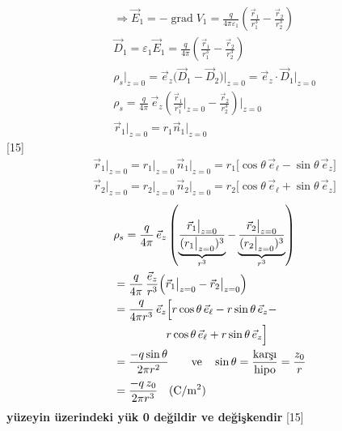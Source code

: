 \documentclass[11pt,a4paper]{article}
\begin{document}
\begin{align*}
&\Rightarrow\vec E_1=-\operatorname{grad}V_1=\frac{q}{4\pi\varepsilon_1}\left(\frac{\vec r_1}{r_1^3}-\frac{\vec r_2}{r_2^3}\right)\\
&\vec D_1=\varepsilon_1\vec E_1=\frac{q}{4\pi}\left(\frac{\vec r_1}{r_1^3}-\frac{\vec r_2}{r_2^3}\right)\\
&\rho_s\Big|_{z=0}=\vec e_z\bigl(\vec D_1-\vec D_2\bigr)\Big|_{z=0}=\vec e_z\cdot\vec D_1\Big|_{z=0}\\
&\rho_s=\frac{q}{4\pi}\,\vec e_z\left(\frac{\vec r_1}{r_1^3}\Big|_{z=0}-\frac{\vec r_2}{r_2^3}\right)\Big|_{z=0}\\
&\vec r_1\Big|_{z=0}=r_1\vec n_1\Big|_{z=0}
\end{align*}
[15]
\begin{align*}
&\vec r_1\Big|_{z=0}=r_1\Big|_{z=0}\,\vec n_1\Big|_{z=0}=r_1\bigl[\cos\theta\,\vec e_\ell-\sin\theta\,\vec e_z\bigr]\\
&\vec r_2\Big|_{z=0}=r_2\Big|_{z=0}\,\vec n_2\Big|_{z=0}=r_2\bigl[\cos\theta\,\vec e_\ell+\sin\theta\,\vec e_z\bigr]
\end{align*}
\begin{align*}
&\rho_s=\frac{q}{4\pi}\,\vec e_z\left(\underbrace{\frac{\vec r_1\big|_{z=0}}{(r_1\big|_{z=0})^3}}_{r^3}-\underbrace{\frac{\vec r_2\big|_{z=0}}{(r_2\big|_{z=0})^3}}_{r^3}\right)\\
&=\frac{q}{4\pi}\,\frac{\vec e_z}{r^3}\Bigl(\vec r_1\big|_{z=0}-\vec r_2\big|_{z=0}\Bigr)\\
&=\frac{q}{4\pi r^3}\,\vec e_z\Bigl[r\cos\theta\,\vec e_\ell-r\sin\theta\,\vec e_z-\\
&\qquad\qquad\ \ r\cos\theta\,\vec e_\ell+r\sin\theta\,\vec e_z\Bigr]\\
&=\frac{-q\sin\theta}{2\pi r^2}\qquad\text{ve}\quad\sin\theta=\frac{\mbox{karşı}}{\mbox{hipo}}=\frac{z_0}{r}\\
&=\frac{-q\,z_0}{2\pi r^3}\quad(\mathrm{C/m^2})
\end{align*}
\textbf{yüzeyin üzerindeki yük 0 değildir ve değişkendir}
[15]
\end{document}
